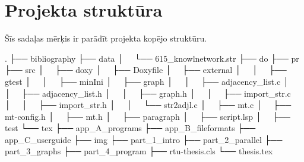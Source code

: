 \section{Projekta struktūra}
Šīs sadaļas mērķis ir parādīt projekta kopējo struktūru.

\begin{code}
.
├── bibliography
├── data
│   └── 615_knowlnetwork.str
├── do
├── pr
├── src
│   ├── doxy
│   ├── Doxyfile
│   ├── external
│   │   ├── gtest
│   │   ├── minIni
│   ├── graph
│   │   ├── adjacency_list.c
│   │   ├── adjacency_list.h
│   │   ├── graph.h
│   │   ├── import_str.c
│   │   ├── import_str.h
│   │   └── str2adjl.c
│   ├── mt.c
│   ├── mt-config.h
│   ├── mt.h
│   ├── paragraph
│   ├── script.lsp
│   ├── test
└── tex
    ├── app_A_programs
    ├── app_B_fileformats
    ├── app_C_userguide
    ├── img
    ├── part_1_intro
    ├── part_2_parallel
    ├── part_3_graphs
    ├── part_4_program
    ├── rtu-thesis.cls
    └── thesis.tex
\end{code}
